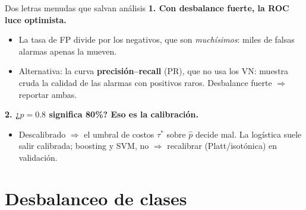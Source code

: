 \documentclass{beamer}
\newcommand{\1}{\mathbb{I}}
\begin{document}
\begin{frame}{Dos letras menudas que salvan análisis}
\small
\textbf{1. Con desbalance fuerte, la ROC luce optimista.}
\begin{itemize}\itemsep2pt
  \item La tasa de FP divide por los negativos, que son \emph{muchísimos}: miles de falsas alarmas apenas la mueven.
  \item Alternativa: la curva \textbf{precisión--recall} (PR), que no usa los VN: muestra cruda la calidad de las alarmas con positivos raros. Desbalance fuerte $\Rightarrow$ reportar ambas.
\end{itemize}
\pause

\vspace{0.1cm}
\textbf{2. ¿$\hat{p} = 0.8$ significa 80\%? Eso es la calibración.}

\begin{center}
\end{center}
\pause

\begin{itemize}\itemsep2pt
  \item Descalibrado $\Rightarrow$ el umbral de costos $\tau^*$ sobre $\hat{p}$ decide mal. La logística suele salir calibrada; boosting y SVM, no $\Rightarrow$ recalibrar (Platt/isotónica) en validación.
\end{itemize}
\end{frame}


\section{Desbalanceo de clases}
\begin{frame}[noframenumbering]
\tableofcontents[currentsection]
\end{frame}
\end{document}
